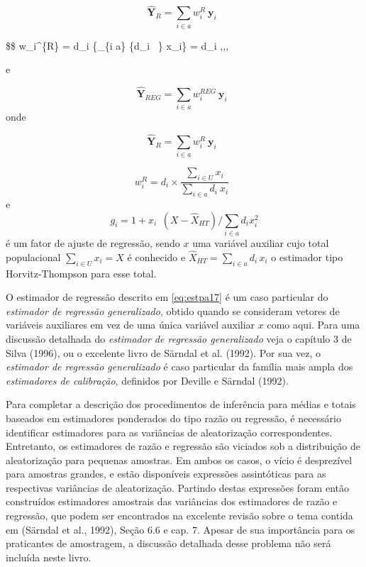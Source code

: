 \documentclass[
  12pt,
  brazilian,
]{book}
\theoremstyle{definition}
\theoremstyle{definition}
\theoremstyle{definition}
\theoremstyle{definition}
\theoremstyle{remark}
\begin{document}
\[
\mathbf{\widehat{Y}}_R = \sum_{i \in a} {w_i^{R} \ } \mathbf{y}_i \,\,\,  \label{eq:estpa15}
\]

\$\$
w\_i\^{}\{R\} = d\_i \times {} \{\sum\_\{i \in a\} \{d\_i ~\} x\_i\} = d\_i \times {} ,,, \label{eq:estpa16}

e

\[
\mathbf{\widehat{Y}}_{REG} = \sum_{i \in a} {w_i^{REG} \ } \mathbf{y}_i \,\,\,  \label{eq:estpa17}
\]
onde

\[
\mathbf{\widehat{Y}}_R = \sum_{i \in a} {w_i^{R} \ } \mathbf{y}_i \,\,\,  \label{eq:estpa15}
\]

\[
w_i^{R} = d_i \times \frac{\sum_{i \in U} x_i } {\sum_{i \in a} {d_i \ } x_i} \,\,\,  \label{eq:estpa16}
\]
e
\[
g_{i} = 1 + x_{i \mbox{ }} (X - \widehat{X}_{HT}) / \sum_{i \in a} d_i x_i^2
\]
é um fator de ajuste de regressão, sendo \(x\) uma variável auxiliar cujo total populacional \(\sum_{i \in U} x_i = X\) é conhecido e \(\widehat{X}_{HT} = \sum_{i \in a} d_i \, x_i\) o estimador tipo Horvitz-Thompson para esse total.

O estimador de regressão descrito em \eqref{eq:estpa17} é um caso particular do \emph{estimador de regressão generalizado}, obtido quando se consideram vetores de variáveis auxiliares em vez de uma única variável auxiliar \(x\) como aqui. Para uma discussão detalhada do \emph{estimador de regressão generalizado} veja o capítulo 3 de Silva (1996), ou o excelente livro de Särndal et al. (1992). Por sua vez, o \emph{estimador de regressão generalizado} é caso particular da família mais ampla dos \emph{estimadores de calibração}, definidos por Deville e Särndal (1992).

Para completar a descrição dos procedimentos de inferência para médias e totais baseados em estimadores ponderados do tipo razão ou regressão, é necessário identificar estimadores para as variâncias de aleatorização correspondentes. Entretanto, os estimadores de razão e regressão são viciados sob a distribuição de aleatorização para pequenas amostras. Em ambos os casos, o vício é desprezível para amostras grandes, e estão disponíveis expressões assintóticas para as respectivas variâncias de aleatorização. Partindo destas expressões foram então construídos estimadores amostrais das variâncias dos estimadores de razão e regressão, que podem ser encontrados na excelente revisão sobre o tema contida em (Särndal et al., 1992), Seção 6.6 e cap. 7. Apesar de sua importância para os praticantes de amostragem, a discussão detalhada desse problema não será incluída neste livro.
\end{document}
